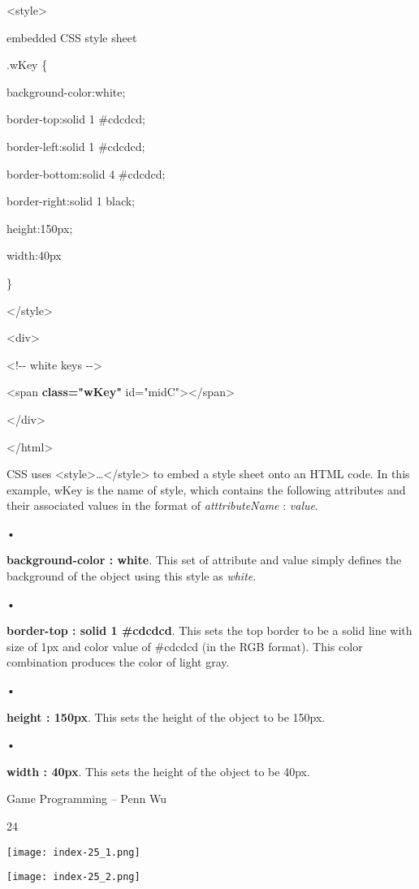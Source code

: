 \documentclass[
]{article}
\begin{document}
\textless style\textgreater{}

embedded CSS style sheet

.wKey \{

background-color:white;

border-top:solid 1 \#cdcdcd;

border-left:solid 1 \#cdcdcd;

border-bottom:solid 4 \#cdcdcd;

border-right:solid 1 black;

height:150px;

width:40px

\}

\textless/style\textgreater{}

\textless div\textgreater{}

\textless!-\/- white keys -\/-\textgreater{}

\textless span \textbf{class="wKey"}
id="midC"\textgreater\textless/span\textgreater{}

\textless/div\textgreater{}

\textless/html\textgreater{}

CSS uses \textless style\textgreater\ldots\textless/style\textgreater{}
to embed a style sheet onto an HTML code. In this example, wKey is the
name of style, which contains the following attributes and their
associated values in the format of \emph{atttributeName} : \emph{value}.

•

\textbf{background-color : white}. This set of attribute and value
simply defines the background of the object using this style as
\emph{white}.

•

\textbf{border-top : solid 1 \#cdcdcd}. This sets the top border to be a
solid line with size of 1px and color value of \#cdcdcd (in the RGB
format). This color combination produces the color of light gray.

•

\textbf{height : 150px}. This sets the height of the object to be 150px.

•

\textbf{width : 40px}. This sets the height of the object to be 40px.

Game Programming -- Penn Wu

24

\protect\hypertarget{index_split_003.htmlux5cux23p25}{}{}\texttt{[image: index-25\_1.png]}

\texttt{[image: index-25\_2.png]}
\end{document}
